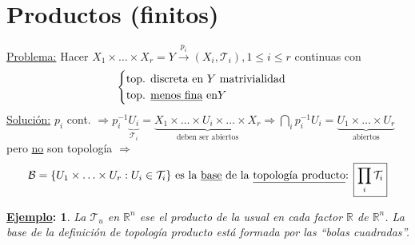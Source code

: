 \documentclass[10pt,a4paper,openright]{book}
\theoremstyle{break}
\newtheorem*{ej}{\underline{Ejemplo}:}
\begin{document}
\section{Productos (finitos)}%
\label{sec:productos_finitos_}
\underline{Problema:} Hacer $X_1 \times \ldots \times X_r = Y \xrightarrow{p_i} \left( X_i, \mathcal{T}_i \right), 1 \le i \le r$ continuas con 
\[
\begin{cases}
    \text{top. discreta en } Y \text{ matrivialidad}\\
    \text{top. \underline{menos fina} en} Y
\end{cases} 
\]
\underline{Solución:} $p_i$ cont. $\Rightarrow p_i^{-1} \underbrace{U_i}_{\mathcal{T}_i} = \underbrace{X_1 \times \ldots \times U_i \times \ldots \times X_r}_{\text{deben ser abiertos}}  \Rightarrow \bigcap_{i} p_i^{-1}U_i = \underbrace{U_1 \times \ldots \times U_r}_{\text{abiertos}}$ pero \underline{no} son topología $\Rightarrow$
\[
\mathcal{B} = \{U_1 \times \ldots \times U_r: U_i \in \mathcal{T}_i \} \text{ es la \underline{base} de la \underline{topología producto}: } \boxed{\prod_{i} \mathcal{T}_i} 
\]
\begin{ej}
La $\mathcal{T}_u$ en $\mathbb{R}^n$ ese el producto de la usual en cada factor $\mathbb{R}$ de $\mathbb{R}^n$. La base de la definición de topología producto está formada por las ``bolas cuadradas''.
\end{ej}
\end{document}
